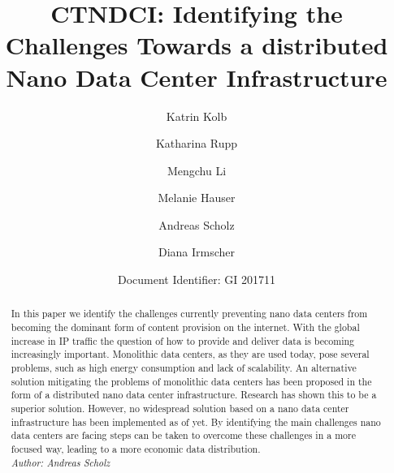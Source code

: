 \documentclass[sigchi-a, authorversion]{acmart}
\begin{document}
\title{CTNDCI: Identifying the Challenges Towards a distributed Nano Data Center Infrastructure}

\author{Katrin Kolb}

\author{Katharina Rupp}

\author{Mengchu Li}

\author{Melanie Hauser}

\author{Andreas Scholz}

\author{Diana Irmscher} 

\author{Document Identifier: GI 201711}
\renewcommand{\shortauthors}{Katrin Kolb et al.}

\begin{abstract}  %

In this paper we identify the challenges currently preventing nano data centers from becoming the dominant form of content provision on the internet. With the global increase in IP traffic the question of how to provide and deliver data is becoming increasingly important. Monolithic data centers, as they are used today, pose several problems, such as high energy consumption and lack of scalability. An alternative solution mitigating the problems of monolithic data centers has been proposed in the form of a distributed nano data center infrastructure. Research has shown this to be a superior solution. However, no widespread solution based on a nano data center infrastructure has been implemented as of yet. By identifying the main challenges nano data centers are facing steps can be taken to overcome these challenges in a more focused way, leading to a more economic data distribution.\\
\textit{Author: Andreas Scholz}\\
\end{abstract}
\end{document}
